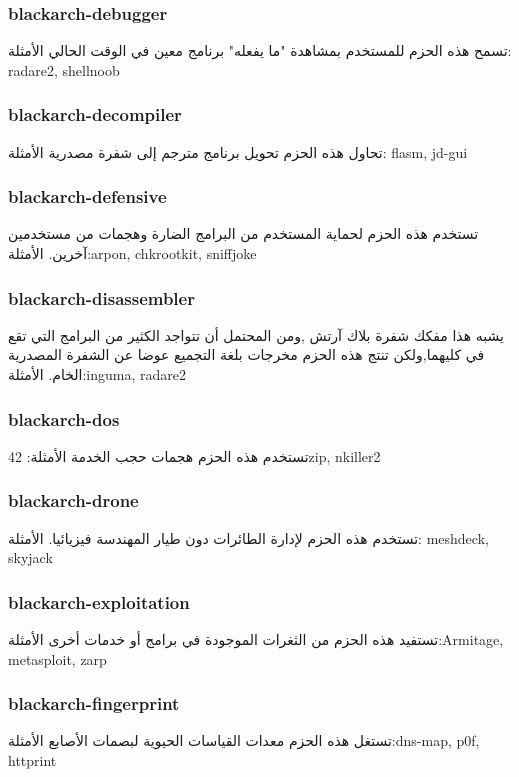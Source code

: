 \documentclass[a4paper, oneside, 11pt]{book}
\begin{document}
\subsubsection{blackarch-debugger}
تسمح هذه الحزم للمستخدم بمشاهدة "ما يفعله" برنامج معين في الوقت الحالي 
الأمثلة: radare2, shellnoob


\subsubsection{blackarch-decompiler}
تحاول هذه الحزم تحويل برنامج مترجم إلى شفرة مصدرية
الأمثلة: flasm, jd-gui 


\subsubsection{blackarch-defensive}
تستخدم هذه الحزم لحماية المستخدم من البرامج الضارة وهجمات من مستخدمين آخرين.
الأمثلة:arpon, chkrootkit, sniffjoke 


\subsubsection{blackarch-disassembler}
يشبه هذا مفكك شفرة بلاك آرتش ,ومن المحتمل أن تتواجد الكثير من البرامج التي تقع في كليهما,ولكن تنتج هذه الحزم مخرجات بلغة التجميع عوضا عن الشفرة المصدرية الخام.
الأمثلة:inguma, radare2 


\subsubsection{blackarch-dos}
تستخدم هذه الحزم هجمات حجب الخدمة
الأمثلة:  42zip, nkiller2 

\subsubsection{blackarch-drone}
تستخدم هذه الحزم لإدارة الطائرات دون طيار المهندسة فيزيائيا.
الأمثلة: meshdeck, skyjack 


\subsubsection{blackarch-exploitation}
تستفيد هذه الحزم من الثغرات الموجودة في برامج أو خدمات أخرى
الأمثلة:Armitage, metasploit, zarp

\subsubsection{blackarch-fingerprint}
تستغل هذه الحزم معدات القياسات الحيوية لبصمات الأصابع
الأمثلة:dns-map, p0f, httprint 
\end{document}
